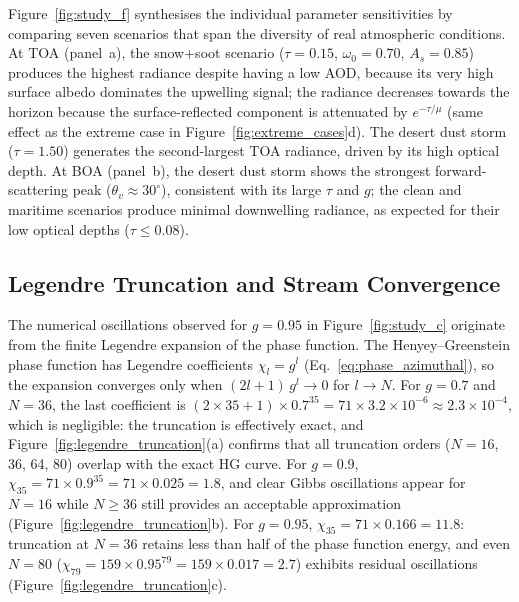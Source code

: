 \documentclass[a4paper, 11pt]{article}
\begin{document}
Figure~\ref{fig:study_f} synthesises the individual parameter
sensitivities by comparing seven scenarios that span the diversity of
real atmospheric conditions.  At TOA (panel~a), the snow+soot scenario
($\tau = 0.15$, $\omega_0 = 0.70$, $A_s = 0.85$) produces the highest
radiance despite having a low AOD, because its very high surface
albedo dominates the upwelling signal; the radiance decreases towards
the horizon because the surface-reflected component is attenuated by
$e^{-\tau/\mu}$ (same effect as the extreme case in
Figure~\ref{fig:extreme_cases}d).  The desert dust storm ($\tau =
1.50$) generates the second-largest TOA radiance, driven by its high
optical depth.  At BOA (panel~b), the desert dust storm shows the
strongest forward-scattering peak ($\theta_v \approx 30^{\circ}$),
consistent with its large $\tau$ and $g$; the clean and maritime
scenarios produce minimal downwelling radiance, as expected for their
low optical depths ($\tau \leq 0.08$).

\subsection{Legendre Truncation and Stream Convergence}
\label{sec:legendre_truncation}

The numerical oscillations observed for $g = 0.95$ in
Figure~\ref{fig:study_c} originate from the finite Legendre expansion
of the phase function.  The Henyey--Greenstein phase function has
Legendre coefficients $\chi_l = g^l$
(Eq.~\ref{eq:phase_azimuthal}), so the expansion converges only when
$(2l+1)\,g^l \to 0$ for $l \to N$.  For $g = 0.7$ and $N = 36$, the
last coefficient is $(2 \times 35 + 1) \times 0.7^{35} = 71 \times
3.2 \times 10^{-6} \approx 2.3 \times 10^{-4}$, which is negligible:
the truncation is effectively exact, and
Figure~\ref{fig:legendre_truncation}(a) confirms that all truncation
orders ($N = 16$, 36, 64, 80) overlap with the exact HG curve.  For
$g = 0.9$, $\chi_{35} = 71 \times 0.9^{35} = 71 \times 0.025 = 1.8$,
and clear Gibbs oscillations appear for $N = 16$ while $N \geq 36$
still provides an acceptable approximation
(Figure~\ref{fig:legendre_truncation}b).  For $g = 0.95$,
$\chi_{35} = 71 \times 0.166 = 11.8$: truncation at $N = 36$ retains
less than half of the phase function energy, and even $N = 80$
($\chi_{79} = 159 \times 0.95^{79} = 159 \times 0.017 = 2.7$)
exhibits residual oscillations
(Figure~\ref{fig:legendre_truncation}c).
\end{document}
